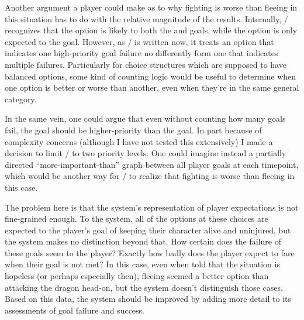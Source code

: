 Another argument a player could make as to why fighting is worse than fleeing in this situation has to do with the relative magnitude of the results.
%
Internally, \dunyazad/ recognizes that the  option is likely to  both the  and  goals, while the  option is only expected to  the  goal.
%
However, as \dunyazad/ is written now, it treats an option that indicates one high-priority goal failure no differently form one that indicates multiple failures.
%
Particularly for choice structures which are supposed to have balanced options, some kind of counting logic would be useful to determine when one option is better or worse than another, even when they're in the same general category.


In the same vein, one could argue that even without counting how many goals fail, the  goal should be higher-priority than the  goal.
%
In part because of complexity concerns (although I have not tested this extensively) I made a decision to limit \dunyazad/ to two priority levels.
%
One could imagine instead a partially directed ``more-important-than'' graph between all player goals at each timepoint, which would be another way for \dunyazad/ to realize that fighting is worse than fleeing in this case.


The problem here is that the system's representation of player expectations is not fine-grained enough.
%
To the system, all of the options at these choices are expected to  the player's goal of keeping their character alive and uninjured, but the system makes no distinction beyond that.
%
How certain does the failure of these goals seem to the player?
%
Exactly how badly does the player expect to fare when their goal is not met?
%
In this case, even when told that the situation is hopeless (or perhaps especially then), fleeing seemed a better option than attacking the dragon head-on, but the system doesn't distinguish those cases.
%
Based on this data, the system should be improved by adding more detail to its assessments of goal failure and success.


